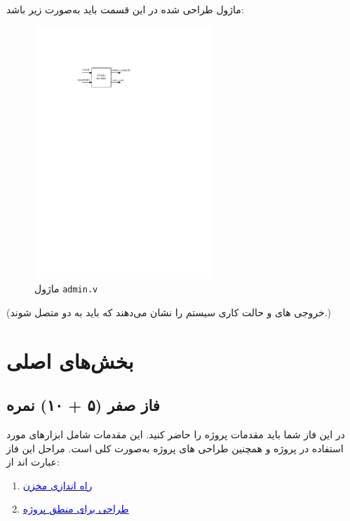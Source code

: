 \documentclass[]{article}
\begin{document}
ماژول طراحی شده در این قسمت باید به‌صورت زیر باشد:


\begin{figure}[h]
	\centering
	\includegraphics[width=0.6\textwidth]{images/admin.pdf}
	\caption{ماژول \texttt{admin.v}}
	\label{ماژول admin.v}
\end{figure}


 (خروجی های  و  حالت کاری سیستم را نشان می‌دهند که باید به دو  متصل شوند.)


\section*{{\titr بخش‌های اصلی }}


\subsection*{{\titr فاز صفر} (۵ + ۱۰) نمره} 

در این فاز شما باید مقدمات پروژه را حاضر کنید. این مقدمات شامل ابزارهای مورد استفاده در پروژه و همچنین طراحی  های پروژه به‌صورت کلی است. مراحل این فاز عبارت اند از:

\begin{enumerate}
	\item
	\hyperref[subsubsec:github]{\textcolor{blue}{راه اندازی مخزن }}
	
	\item
	\hyperref[subsubsec:fsm]{\textcolor{blue}{طراحی  برای منطق پروژه}}
\end{enumerate}
\end{document}
